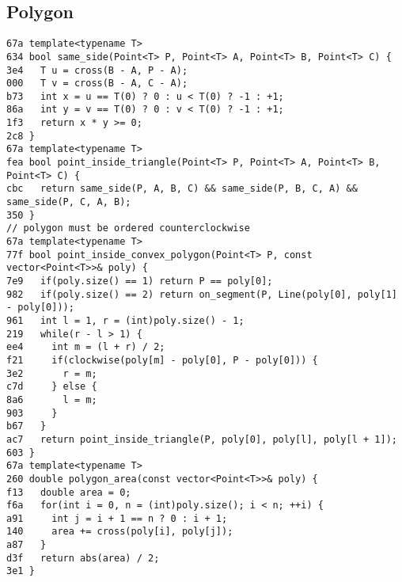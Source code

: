 \documentclass[10pt, a4paper, twoside]{article}
\begin{document}
\subsection{Polygon}
\begin{lstlisting}
67a template<typename T>
634 bool same_side(Point<T> P, Point<T> A, Point<T> B, Point<T> C) {
3e4   T u = cross(B - A, P - A);
000   T v = cross(B - A, C - A);
b73   int x = u == T(0) ? 0 : u < T(0) ? -1 : +1;
86a   int y = v == T(0) ? 0 : v < T(0) ? -1 : +1;
1f3   return x * y >= 0;
2c8 }
67a template<typename T>
fea bool point_inside_triangle(Point<T> P, Point<T> A, Point<T> B, Point<T> C) {
cbc   return same_side(P, A, B, C) && same_side(P, B, C, A) && same_side(P, C, A, B);
350 }
// polygon must be ordered counterclockwise
67a template<typename T>
77f bool point_inside_convex_polygon(Point<T> P, const vector<Point<T>>& poly) {
7e9   if(poly.size() == 1) return P == poly[0];
982   if(poly.size() == 2) return on_segment(P, Line(poly[0], poly[1] - poly[0]));
961   int l = 1, r = (int)poly.size() - 1;
219   while(r - l > 1) {
ee4     int m = (l + r) / 2;
f21     if(clockwise(poly[m] - poly[0], P - poly[0])) {
3e2       r = m;
c7d     } else {
8a6       l = m;
903     }
b67   }
ac7   return point_inside_triangle(P, poly[0], poly[l], poly[l + 1]);
603 }
67a template<typename T>
260 double polygon_area(const vector<Point<T>>& poly) {
f13   double area = 0;
f6a   for(int i = 0, n = (int)poly.size(); i < n; ++i) {
a91     int j = i + 1 == n ? 0 : i + 1;
140     area += cross(poly[i], poly[j]);
a87   }
d3f   return abs(area) / 2;
3e1 }
\end{lstlisting}
\end{document}
